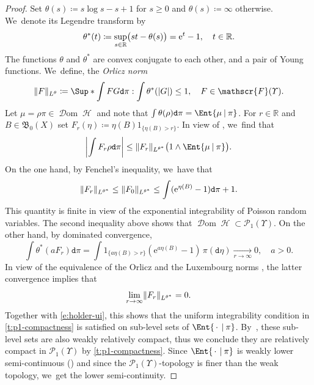 \documentclass[10pt]{amsart}
\newcommand{\real}{\mathbb{R}}
\theoremstyle{definition}
\theoremstyle{remark}
\DeclarePairedDelimiter{\paren}{\lparen}{\rparen}
\DeclarePairedDelimiter{\abs}{\lvert}{\rvert}
\DeclarePairedDelimiter{\norm}{\lVert}{\rVert}
\newcommand{\given}[1][]{%
\nonscript\:#1\vert
\allowbreak
\nonscript\:
\mathopen{}}
\DeclareMathOperator{\ent}{\mathcal{H}}
\DeclareMathOperator{\dom}{\mathscr{D}om}
\newcommand{\emparg}{\,\cdot\,}
\begin{document}
\begin{proof}
Set $\theta(s) \coloneq s \log s - s + 1$ for $s \geq 0$ and $\theta(s) \coloneq \infty$ otherwise. We~denote its Legendre transform by
\begin{equation*}
\theta^{*}(t) \coloneq \sup_{s \in \real} \paren[\big]{s t - \theta(s) } = \mathrm{e}^{t} - 1, \quad t \in \real.
\end{equation*}
The functions $\theta$ and $\theta^{*}$ are convex conjugate to each other, and a pair of Young functions. We~define, the \emph{Orlicz norm}
\begin{equation*}
\norm{F}_{L^\theta} \coloneq \Sup*{ \int FG \mathtt{d} \pi : \int \theta^{*}(|G|) \leq 1 }, \quad F \in \mathscr{F}(\varUpsilon).
\end{equation*}
Let $\mu=\rho\pi \in \dom \ent$ and note that $\int \theta(\rho) \mathtt{d} \pi = \Ent{\mu \given \pi}$.
For $r \in \real$ and $B \in \mathfrak{B}_{0}(X)$ set $F_{r}(\eta) \coloneq \eta(B) 1_{\{ \eta(B) > r\}}$.
In view of \cite[Eq.\,(9.13), p.\,73]{Orlicz}, we~find that
\begin{equation}\label{e:holder-ui}
\abs*{ \int F_{r} \rho \mathtt{d} \pi } \leq \norm{F_{r}}_{L^{\theta^{*}}} \paren[\big]{1 \wedge \Ent{\mu \given \pi}}.
\end{equation}
On the one hand, by Fenchel's inequality, we~have that
\begin{equation}\label{eq:FenchelIotaB}
\norm{F_{r}}_{L^{\theta^{*}}}\leq \norm{F_{0}}_{L^{\theta^{*}}} \leq \int (\mathrm{e}^{\eta(B)} - 1) \mathtt{d} \pi + 1.
\end{equation}
This quantity is finite in view of the exponential integrability of Poisson random variables.
The second inequality above shows that $\dom \ent \subset \mathscr{P}_{1}(\varUpsilon)$.
On the other hand, by dominated convergence,
\begin{equation*}
\int \theta^{*}(a F_{r}) \mathtt{d} \pi = \int 1_{\{ a \eta(B) > r \}} (\mathrm{e}^{a \eta(B)} - 1)\, \pi(\mathtt{d} \eta) \xrightarrow[r\to\infty]{} 0, \quad a > 0.
\end{equation*}
In view of the equivalence of the Orlicz and the Luxembourg norms \cite[Eq.\,(9.24), p.\,80]{Orlicz}, the latter convergence implies that
\begin{equation*}
\lim_{r \to \infty} \norm{F_{r}}_{L^{\theta^{*}}} = 0.
\end{equation*}
Together with \cref{e:holder-ui}, this shows that the uniform integrability condition in \cref{t:p1-compactness} is satisfied on sub-level sets of $\Ent{\emparg \given \pi}$.
By~\cite[Lem.\,6.2.12]{DemboZeitouni}, these sub-level sets are also weakly relatively compact, thus we conclude they are relatively compact in $\mathscr{P}_{1}(\varUpsilon)$ by \cref{t:p1-compactness}.
Since $\Ent{ \emparg \given \pi}$ is weakly lower semi-continuous (\eg \cite[Lem.\,6.2.13]{DemboZeitouni}) and since the $\mathscr{P}_{1}(\varUpsilon)$-topology is finer than the weak topology, we~get the lower semi-continuity.
\end{proof}
\end{document}
